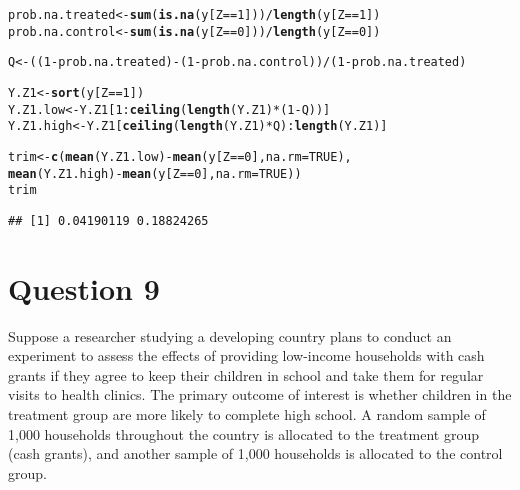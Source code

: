 \documentclass[11pt,notitlepage]{article}\usepackage[]{graphicx}\usepackage[]{color}
\makeatletter
\newcommand{\hlnum}[1]{\textcolor[rgb]{0.686,0.059,0.569}{#1}}%
\newcommand{\hlopt}[1]{\textcolor[rgb]{0,0,0}{#1}}%
\newcommand{\hlstd}[1]{\textcolor[rgb]{0.345,0.345,0.345}{#1}}%
\newcommand{\hlkwb}[1]{\textcolor[rgb]{0.69,0.353,0.396}{#1}}%
\newcommand{\hlkwc}[1]{\textcolor[rgb]{0.333,0.667,0.333}{#1}}%
\newcommand{\hlkwd}[1]{\textcolor[rgb]{0.737,0.353,0.396}{\textbf{#1}}}%
\newenvironment{kframe}{%
 \def\at@end@of@kframe{}%
 \ifinner\ifhmode%
  \def\at@end@of@kframe{\end{minipage}}%
  \begin{minipage}{\columnwidth}%
 \fi\fi%
 \def\FrameCommand##1{\hskip\@totalleftmargin \hskip-\fboxsep
 \colorbox{shadecolor}{##1}\hskip-\fboxsep
     \hskip-\linewidth \hskip-\@totalleftmargin \hskip\columnwidth}%
 \MakeFramed {\advance\hsize-\width
   \@totalleftmargin\z@ \linewidth\hsize
   \@setminipage}}%
 {\par\unskip\endMakeFramed%
 \at@end@of@kframe}
\newenvironment{knitrout}{}{} %
\makeatother
\begin{document}
\begin{enumerate}[a)]
\begin{knitrout}
\begin{kframe}
\begin{alltt}
\hlstd{prob.na.treated} \hlkwb{<-} \hlkwd{sum}\hlstd{(}\hlkwd{is.na}\hlstd{(y[Z}\hlopt{==}\hlnum{1}\hlstd{]))}\hlopt{/}\hlkwd{length}\hlstd{(y[Z}\hlopt{==}\hlnum{1}\hlstd{])}
\hlstd{prob.na.control} \hlkwb{<-} \hlkwd{sum}\hlstd{(}\hlkwd{is.na}\hlstd{(y[Z}\hlopt{==}\hlnum{0}\hlstd{]))}\hlopt{/}\hlkwd{length}\hlstd{(y[Z}\hlopt{==}\hlnum{0}\hlstd{])}

\hlstd{Q} \hlkwb{<-} \hlstd{((}\hlnum{1} \hlopt{-} \hlstd{prob.na.treated)} \hlopt{-} \hlstd{(}\hlnum{1}\hlopt{-} \hlstd{prob.na.control))}\hlopt{/}\hlstd{(}\hlnum{1} \hlopt{-} \hlstd{prob.na.treated)}

\hlstd{Y.Z1} \hlkwb{<-} \hlkwd{sort}\hlstd{(y[Z}\hlopt{==}\hlnum{1}\hlstd{])}
\hlstd{Y.Z1.low} \hlkwb{<-} \hlstd{Y.Z1[}\hlnum{1}\hlopt{:}\hlkwd{ceiling}\hlstd{(}\hlkwd{length}\hlstd{(Y.Z1)}\hlopt{*}\hlstd{(}\hlnum{1}\hlopt{-}\hlstd{Q))]}
\hlstd{Y.Z1.high} \hlkwb{<-} \hlstd{Y.Z1[}\hlkwd{ceiling}\hlstd{(}\hlkwd{length}\hlstd{(Y.Z1)}\hlopt{*}\hlstd{Q)}\hlopt{:}\hlkwd{length}\hlstd{(Y.Z1)]}

\hlstd{trim} \hlkwb{<-} \hlkwd{c}\hlstd{(}\hlkwd{mean}\hlstd{(Y.Z1.low)} \hlopt{-} \hlkwd{mean}\hlstd{(y[Z}\hlopt{==}\hlnum{0}\hlstd{],} \hlkwc{na.rm}\hlstd{=}\hlnum{TRUE}\hlstd{),}
          \hlkwd{mean}\hlstd{(Y.Z1.high)} \hlopt{-} \hlkwd{mean}\hlstd{(y[Z}\hlopt{==}\hlnum{0}\hlstd{],} \hlkwc{na.rm}\hlstd{=}\hlnum{TRUE}\hlstd{))}
\hlstd{trim}
\end{alltt}
\begin{verbatim}
## [1] 0.04190119 0.18824265
\end{verbatim}
\end{kframe}
\end{knitrout}




\end{enumerate}
\section*{Question 9}
Suppose a researcher studying a developing country plans to conduct an experiment to assess the effects of providing low-income households with cash grants if they agree to keep their children in school and take them for regular visits to health clinics. The primary outcome of interest is whether children in the treatment group are more likely to complete high school. A random sample of 1,000 households throughout the country is allocated to the treatment group (cash grants), and another sample of 1,000 households is allocated to the control group.
\end{document}
